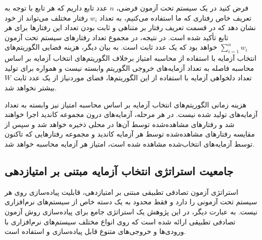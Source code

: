 فرض کنید در یک سیستم تحت آزمون فرضی، $n$ عدد تابع داریم که هر تابع با توجه به تعریف خاص رفتاری که ما استفاده می‌کنیم، به تعداد $w_i$ رفتار مختلف می‌تواند از خود نشان دهد که در قسمت تعریف رفتار بر متناهی و ثابت بودن تعداد این رفتارها برای هر تابع تأکید شده است. در نتیجه، در مجموع تعداد رفتارهای سیستم تحت آزمون $\sum_{i=1}^{n} w_i$ خواهد بود که یک عدد ثابت است. به بیان دیگر، هزینه فضایی الگوریتم‌های انتخاب آزمایه با استفاده از محاسبه امتیاز برخلاف الگوریتم‌های انتخاب آزمایه بر اساس محاسبه فاصله به تعداد آزمایه‌های خروجی الگوریتم وابسته نیست و همواره برای تولید تعداد دلخواهی آزمایه با استفاده از این الگوریتم‌ها، فضای موردنیاز از یک عدد ثابت $W$ بیشتر نخواهد شد.

هزینه زمانی الگوریتم‌های انتخاب آزمایه بر اساس محاسبه امتیاز نیز وابسته به تعداد آزمایه‌های تولید شده نیست. در هر مرحله، آزمایه‌های درون مجموعه کاندید اجرا خواهند شد و رفتارهای مشاهده‌شده توسط آن‌ها در محلی ذخیره خواهد شد و سپس از مقایسه رفتارهای مشاهده‌شده توسط هر آزمایه کاندید و مجموعه رفتارهایی که تاکنون توسط آزمایه‌های انتخاب‌شده مشاهده شده است، امتیاز هر آزمایه محاسبه خواهد شد.

\subsection{جامعیت استراتژی انتخاب آزمایه مبتنی بر امتیازدهی}

استراتژی آزمون تصادفی تطبیقی مبتنی بر امتیازدهی، قابلیت پیاده‌سازی روی هر سیستم تحت آزمونی را دارد و فقط محدود به یک دسته خاص از سیستم‌های نرم‌افزاری نیست. به عبارت دیگر، در این پژوهش یک استراتژی جامع برای پیاده‌سازی روش آزمون تصادفی تطبیقی ارائه شده است که روی انواع مختلف سیستم‌های نرم‌افزاری با ورودی‌ها و خروجی‌های متنوع قابل پیاده‌سازی و استفاده است.




